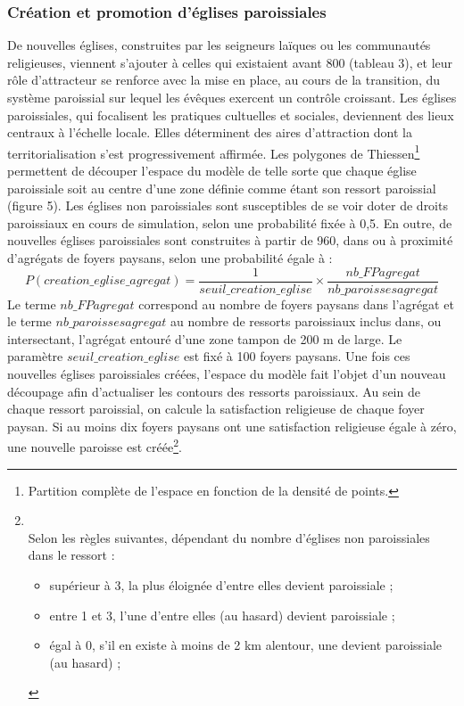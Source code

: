 \subsubsection{Création et promotion d'églises paroissiales}
De nouvelles églises, construites par les seigneurs laïques ou les communautés religieuses, viennent s'ajouter à celles qui existaient avant 800 (tableau 3), et leur rôle d'attracteur se renforce avec la mise en place, au cours de la transition, du système paroissial sur lequel les évêques exercent un contrôle croissant.
Les églises paroissiales, qui focalisent les pratiques cultuelles et sociales, deviennent des lieux centraux à l'échelle locale.
Elles déterminent des aires d'attraction dont la territorialisation s'est progressivement affirmée.
Les polygones de Thiessen\footnote{
Partition complète de l’espace en fonction de la densité de points.
} permettent de découper l'espace du modèle de telle sorte que chaque église paroissiale soit au centre d'une zone définie comme étant son ressort paroissial (figure 5).
Les églises non paroissiales sont susceptibles de se voir doter de droits paroissiaux en cours de simulation, selon une probabilité fixée à 0,5.
En outre, de nouvelles églises paroissiales sont construites à partir de 960, dans ou à proximité d'agrégats de foyers paysans, selon une probabilité égale à :
$$P(creation\_eglise\_agregat) = \frac{1}{seuil\_creation\_eglise} × \frac{nb\_FPagregat}{nb\_paroissesagregat}$$
Le terme $nb\_FPagregat$ correspond au nombre de foyers paysans dans
l'agrégat et le terme $nb\_paroissesagregat$ au nombre de ressorts paroissiaux inclus dans, ou intersectant, l'agrégat entouré d'une zone tampon de 200 m de large.
Le paramètre $seuil\_creation\_eglise$ est fixé à 100 foyers paysans.
Une fois ces nouvelles églises paroissiales créées, l'espace du modèle fait l'objet d'un nouveau découpage afin d'actualiser les contours des ressorts paroissiaux.
Au sein de chaque ressort paroissial, on calcule la satisfaction religieuse de chaque foyer paysan.
Si au moins dix foyers paysans ont une satisfaction religieuse égale à zéro, une nouvelle paroisse est créée\footnote{
	\\
Selon les règles suivantes, dépendant du nombre d’églises non paroissiales dans le ressort :
\begin{itemize}
	\item supérieur à 3, la plus éloignée d’entre elles devient paroissiale ;
	\item entre 1 et 3, l’une d’entre elles (au hasard) devient paroissiale ;
	\item égal à 0, s’il en existe à moins de 2 km alentour, une devient paroissiale (au hasard) ;
\end{itemize}
}.

